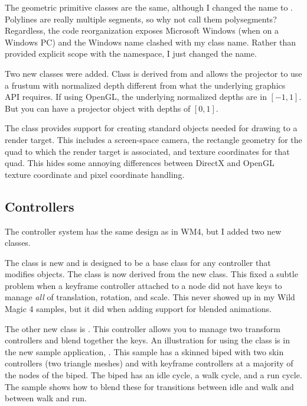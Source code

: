 \documentclass{article}
\begin{document}
The geometric primitive classes are the same, although I changed the
name  to .  Polylines are really multiple
segments, so why not call them polysegments?  Regardless, the code
reorganization exposes Microsoft Windows (when on a Windows PC) and the
Windows name  clashed with my class name.  Rather than
provided explicit scope with the  namespace, I just changed
the name.

Two new classes were added.  Class  is derived from
 and allows the projector to use a frustum with normalized
depth different from what the underlying graphics API requires.  If using
OpenGL, the underlying normalized depths are in $[-1,1]$.  But you can
have a projector object with depths of $[0,1]$.

The class  provides support for creating standard
objects needed for drawing to a render target.  This includes a screen-space
camera, the rectangle geometry for the quad to which the render target
is associated, and texture coordinates for that quad.  This hides some
annoying differences between DirectX and OpenGL texture coordinate and
pixel coordinate handling.

\subsection{Controllers}

The controller system has the same design as in WM4, but I added two new
classes.

The  class is new and is designed to be a base
class for any controller that modifies  objects.  The
 class is now derived from the new class.  This
fixed a subtle problem when a keyframe controller attached to a node
did not have keys to manage {\em all} of translation, rotation, and
scale.  This never showed up in my Wild Magic 4 samples, but it did
when adding support for blended animations.

The other new class is .  This controller
allows you to manage two transform controllers and blend together the
keys.  An illustration for using the class is in the new sample
application, .  This sample has
a skinned biped with two skin controllers (two triangle meshes) and with
keyframe controllers at a majority of the nodes of the biped.  The biped
has an idle cycle, a walk cycle, and a run cycle.  The sample shows how
to blend these for transitions between idle and walk and between walk
and run.
\end{document}
